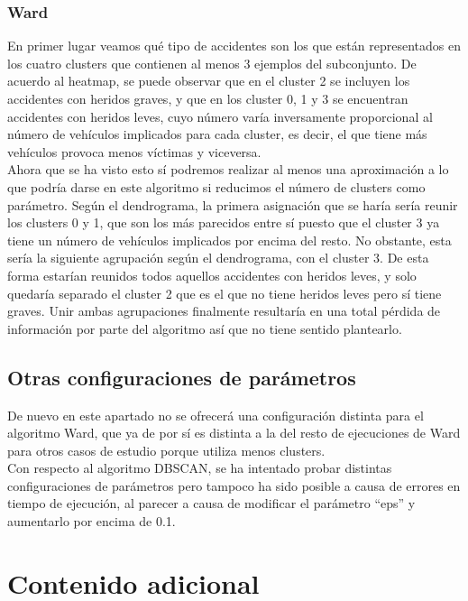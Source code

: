 	\subsubsection{Ward}
	
	En primer lugar veamos qué tipo de accidentes son los que están representados en los cuatro clusters que contienen al menos 3 ejemplos del subconjunto. De acuerdo al heatmap, se puede observar que en el cluster 2 se incluyen los accidentes con heridos graves, y que en los cluster 0, 1 y 3 se encuentran accidentes con heridos leves, cuyo número varía inversamente proporcional al número de vehículos implicados para cada cluster, es decir, el que tiene más vehículos provoca menos víctimas y viceversa.\\
	
	Ahora que se ha visto esto sí podremos realizar al menos una aproximación a lo que podría darse en este algoritmo si reducimos el número de clusters como parámetro. Según el dendrograma, la primera asignación que se haría sería reunir los clusters 0 y 1, que son  los más parecidos entre sí puesto que el cluster 3 ya tiene un número de vehículos implicados por encima del resto. No obstante, esta sería la siguiente agrupación según el dendrograma, con el cluster 3. De esta forma estarían reunidos todos aquellos accidentes con heridos leves, y solo quedaría separado el cluster 2 que es el que no tiene heridos leves pero sí tiene graves. Unir ambas agrupaciones finalmente resultaría en una total pérdida de información por parte del algoritmo así que no tiene sentido plantearlo.\\
	
	\subsection{Otras configuraciones de parámetros}
	De nuevo en este apartado no se ofrecerá una configuración distinta para el algoritmo Ward, que ya de por sí es distinta a la del resto de ejecuciones de Ward para otros casos de estudio porque utiliza menos clusters.\\
	
	Con respecto al algoritmo DBSCAN, se ha intentado probar distintas configuraciones de parámetros pero tampoco ha sido posible a causa de errores en tiempo de ejecución, al parecer a causa de modificar el parámetro ``eps'' y aumentarlo por encima de 0.1.
	
	\section{Contenido adicional}
	
